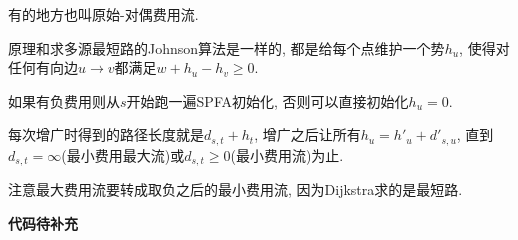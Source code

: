 有的地方也叫原始-对偶费用流.

原理和求多源最短路的Johnson算法是一样的, 都是给每个点维护一个势$h_u$, 使得对任何有向边$u\to v$都满足$w + h_u - h_v \ge 0$.

如果有负费用则从$s$开始跑一遍SPFA初始化, 否则可以直接初始化$h_u = 0$.

每次增广时得到的路径长度就是$d_{s, t} + h_t$, 增广之后让所有$h_u = h'_u + d'_{s, u}$, 直到$d_{s, t} = \infty$(最小费用最大流)或$d_{s, t} \ge 0$(最小费用流)为止.

注意最大费用流要转成取负之后的最小费用流, 因为Dijkstra求的是最短路.

\textbf{代码待补充}